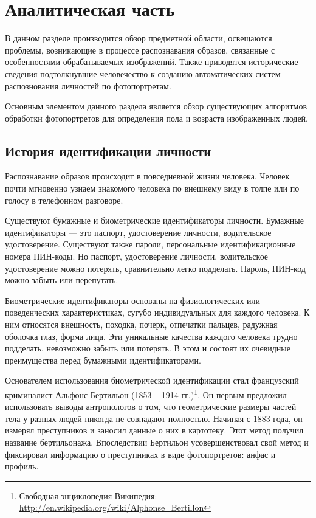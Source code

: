\chapter{Аналитическая часть}
\label{cha:analysis}
%
%
В данном разделе производится обзор предметной области, освещаются проблемы,
возникающие в процессе распознавания образов, связанные с особенностями
обрабатываемых изображений. Также приводятся исторические сведения
подтолкнувшие человечество к созданию автоматических систем распознования
личностей по фотопортретам.

Основным элементом данного раздела является обзор
существующих алгоритмов обработки фотопортретов для определения пола и возраста
изображенных людей.

\section{История идентификации личности}
Распознавание образов происходит в повседневной жизни человека. Человек почти
мгновенно узнаем знакомого человека по внешнему виду в толпе или по голосу в
телефонном разговоре.


Существуют бумажные и биометрические идентификаторы личности. Бумажные
идентификаторы --- это паспорт, удостоверение личности, водительское
удостоверение. Существуют также пароли, персональные идентификационные номера
ПИН-коды. Но паспорт, удостоверение личности, водительское удостоверение можно
потерять, сравнительно легко подделать. Пароль, ПИН-код можно забыть или
перепутать.

Биометрические идентификаторы основаны на физиологических или поведенческих
характеристиках, сугубо индивидуальных для каждого человека. К ним относятся
внешность, походка, почерк, отпечатки пальцев, радужная оболочка глаз, форма
лица. Эти уникальные качества каждого человека трудно подделать,
невозможно забыть или потерять. В этом и состоят их очевидные преимущества перед
бумажными идентификаторами.

Основателем использования биометрической идентификации стал французский
криминалист Альфонс
Бертильон (1853 – 1914 гг.)\footnote{Свободная
энциклопедия Википедия: \url{http://en.wikipedia.org/wiki/Alphonse_Bertillon}}.
Он первым предложил использовать выводы антропологов о том, что геометрические
размеры частей тела у разных людей никогда не совпадают полностью. Начиная с
1883 года, он измерял преступников и заносил данные о них в картотеку. Этот
метод получил название бертильонажа. Впоследствии Бертильон усовершенствовал
свой метод и фиксировал информацию о преступниках в виде фотопортретов: анфас и
профиль.

